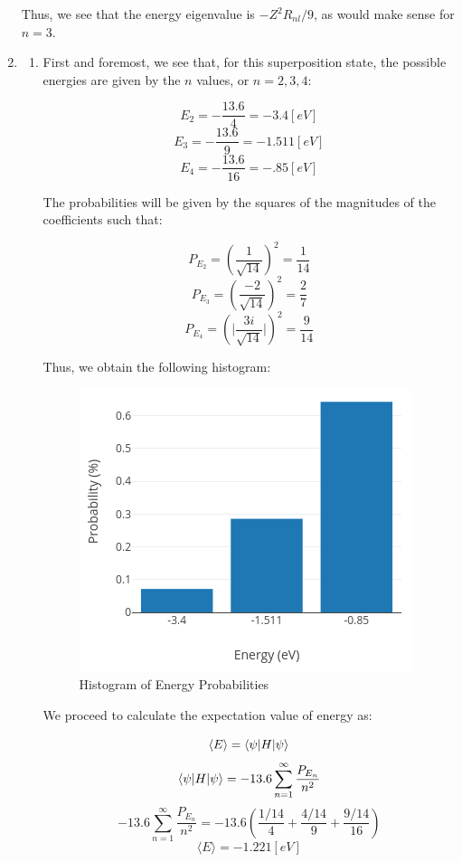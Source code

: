 \begin{enumerate}
  Thus, we see that the energy eigenvalue is $-Z^2R_{nl}/9$, as would make sense for $n=3$.

  \item

    \begin{enumerate}

      \item First and foremost, we see that, for this superposition state, the possible energies are given by the $n$ values, or $n=2,3,4$:

        $$\boxed{E_2=-\frac{13.6}{4}=-3.4[\si{eV}]}$$
        $$\boxed{E_3=-\frac{13.6}{9}=-1.511[\si{eV}]}$$
        $$\boxed{E_4=-\frac{13.6}{16}=-.85[\si{eV}]}$$

        The probabilities will be given by the squares of the magnitudes of the coefficients such that:

        $$\boxed{P_{E_2}=\left( \frac{1}{\sqrt{14}} \right)^2=\frac{1}{14}}$$
        $$\boxed{P_{E_3}=\left( \frac{-2}{\sqrt{14}} \right)^2=\frac{2}{7}}$$
        $$\boxed{P_{E_4}=\left( \Big|\frac{3i}{\sqrt{14}}\Big| \right)^2=\frac{9}{14}}$$

        Thus, we obtain the following histogram:

        \begin{figure}[H]
          \centering
          \includegraphics[width=.5\textwidth]{Figures/HW8-2a}
          \caption{Histogram of Energy Probabilities}
          \label{fig:1}
        \end{figure}

        We proceed to calculate the expectation value of energy as:

        $$\langle E\rangle =\bra{\psi|H}\ket{\psi}$$
        $$\bra{\psi|H}\ket{\psi}=-13.6\sum_{n=1}^{\infty} \frac{P_{E_n}}{n^2}$$
        $$-13.6\sum_{n=1}^{\infty} \frac{P_{E_n}}{n^2}=-13.6\left( \frac{1/14}{4}+\frac{4/14}{9}+\frac{9/14}{16} \right)$$
        $$\boxed{\langle E\rangle=-1.221[\si{eV}]}$$


\end{enumerate}
\end{enumerate}
